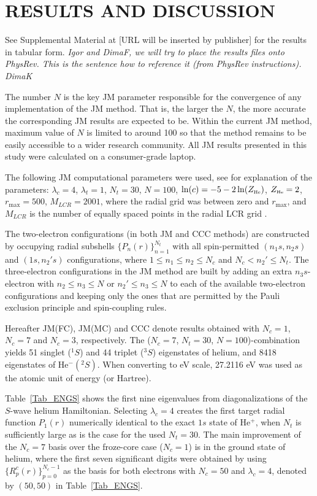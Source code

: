 \documentclass[aip
, pra
, showpacs
, aps
, twocolumn
, groupedaddress
, floatfix
]{revtex4}
\begin{document}
\section{RESULTS AND DISCUSSION}

See Supplemental Material at [URL will be inserted by publisher] for the results in tabular form.
{\em Igor and DimaF, we will try to place the results files onto PhysRev. This is the sentence how to reference it (from PhysRev instructions). DimaK}


The number $N$ is the key JM parameter responsible for the convergence of any implementation of the JM method.
That is, the larger the $N$, the more accurate the corresponding JM results are expected to be.
Within the current JM method, maximum value of $N$ is limited to around 100 so that the method remains to be easily accessible
to a wider research community. All JM results presented in this study were calculated on a consumer-grade laptop.


The following JM computational parameters were used, see \cite{KB10p022708} for explanation of the parameters:
$\lambda_c=4$, $\lambda_t=1$, $N_t=30$, $N=100$, $\ln(c)=-5 - 2\ln(Z_{\mbox{\tiny{He}}} )$, $Z_{\mbox{\tiny{He}}}=2$, $r_{\max}=500$,
$M_{LCR}=2001$, where the radial grid was between zero and $r_{\max}$, and
$M_{LCR}$ is the number of equally spaced points in the radial LCR grid \cite{KB10p022708}.


The two-electron configurations (in both JM and CCC methods) are constructed by occupying  radial subshells $\{P_n(r)\}_{n=1}^{N_t}$
with all spin-permitted $(n_1s,n_2s)$ and $(1s,n_2's)$ configurations,
where $1 \leq n_1 \leq n_2 \leq N_c$ and $N_c<n_2' \leq N_t$.
The three-electron configurations in the JM method are built by adding an extra $n_3s$-electron with
$ n_2 \leq n_3 \leq N$ or $ n_2' \leq n_3 \leq N$ to each of the available two-electron configurations and keeping only the ones that are permitted by the Pauli exclusion principle and spin-coupling rules.


Hereafter JM(FC), JM(MC) and CCC denote results obtained with $N_c=1$, $N_c=7$ and $N_c=3$, respectively.
The ($N_c=7$, $N_t=30$, $N=100$)-combination yields 51 singlet ($^1S$) and 44 triplet ($^3S$) eigenstates of helium, and 8418 eigenstates of He$^-(^2S)$.
When converting to eV scale, 27.2116 eV was used as the atomic unit of energy (or Hartree).


Table~\ref{Tab_ENGS} shows the first nine eigenvalues from diagonalizations of the $S$-wave helium Hamiltonian.
Selecting $\lambda_c=4$ creates the first target radial function $P_1(r)$ numerically identical to the exact $1s$ state of He$^+$,
when $N_t$ is sufficiently large as is the case for the used $N_t=30$.
The main improvement of the $N_c=7$ basis over the froze-core case ($N_c=1$) is in the ground state of helium, where
the first seven significant digits \cite{G94} were obtained by using
$\{R^{c}_p(r)\}_{p=0}^{N_c-1}$ as the basis for both electrons with $N_c=50$ and $\lambda_c=4$, denoted by $(50,50)$ in Table~\ref{Tab_ENGS}.
\end{document}
